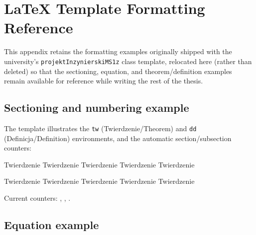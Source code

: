 \appendix
\label{chap:appendices}

\section{LaTeX Template Formatting Reference}
\label{app:template-reference}

This appendix retains the formatting examples originally shipped with the
university's \texttt{projektInzynierskiMS1z} class template, relocated here
(rather than deleted) so that the sectioning, equation, and theorem/definition
examples remain available for reference while writing the rest of the thesis.

\subsection{Sectioning and numbering example}
\label{app:template-sectioning}

The template illustrates the \texttt{tw} (Twierdzenie/Theorem) and \texttt{dd}
(Definicja/Definition) environments, and the automatic section/subsection
counters:

\begin{twa}
Twierdzenie Twierdzenie Twierdzenie Twierdzenie Twierdzenie
\end{twa}
\begin{dd}
Twierdzenie Twierdzenie Twierdzenie Twierdzenie Twierdzenie
\end{dd}

Current counters: \thesection, \thesubsection, \thesubsubsection.

\subsection{Equation example}
\label{app:template-equations}

